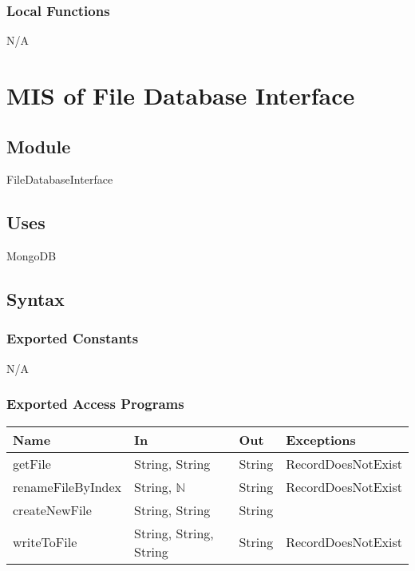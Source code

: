 \documentclass[12pt, titlepage]{article}
\begin{document}
	\subsubsection{Local Functions}
	
	N/A
	
	\newpage
	
	\section{MIS of File Database Interface} \label{Module}
	
	\subsection{Module}
	
	FileDatabaseInterface
	
	\subsection{Uses}
	
	MongoDB
	
	\subsection{Syntax}
	
	\subsubsection{Exported Constants}
	
	N/A
	
	\subsubsection{Exported Access Programs}
	
	\begin{center}
		\begin{tabular}{l  l  l  l}
			\hline
			\textbf{Name} & \textbf{In} & \textbf{Out} & \textbf{Exceptions} \\
			\hline
			getFile & String, String & String &  RecordDoesNotExist \\
			\hline
			renameFileByIndex & String, $\mathbb{N}$ & String &  RecordDoesNotExist \\
			\hline
			createNewFile & String, String & String &  ~ \\
			\hline
			writeToFile & String, String, String & String &  RecordDoesNotExist \\
			\hline
		\end{tabular}
	\end{center}
	
\end{document}
